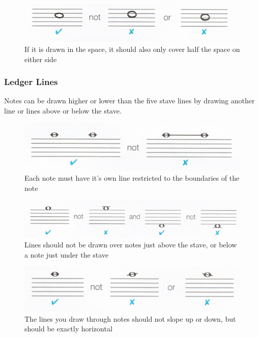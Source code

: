 \begin{figure}[h!]
  \includegraphics[width=\linewidth]{gfx/basic/semibreve-on-space.png}
  \centering
  \caption{If it is drawn in the space, it should also only cover half the space on either side}
  \label{fig:SemibreveOnSpace}
\end{figure}

\subsubsection*{Ledger Lines}

Notes can be drawn higher or lower than the five stave lines by drawing another line or lines above or below the stave.

\begin{figure}[h!]
  \includegraphics[width=\linewidth]{gfx/basic/ledger-boundaries.png}
  \centering
  \caption{Each note must have it's own line restricted to the boundaries of the note}
  \label{fig:LedgerBoundaries}
\end{figure}


\begin{figure}[h!]
  \includegraphics[width=\linewidth]{gfx/basic/ledger-above.png}
  \centering
  \caption{Lines should not be drawn over notes just above the stave, or below a note just under the stave}
  \label{fig:LedgerAbove}
\end{figure}


\begin{figure}[h!]
  \includegraphics[width=\linewidth]{gfx/basic/ledger-slope.png}
  \centering
  \caption{The lines you draw through notes should not slope up or down, but should be exactly horizontal}
  \label{fig:LedgerSlope}
\end{figure}

